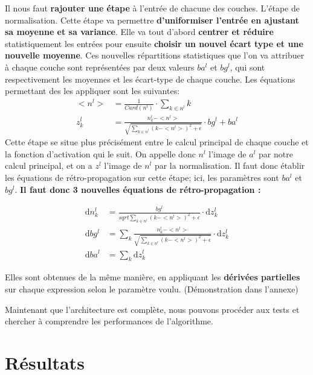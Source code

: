 \documentclass[12pt,a4paper]{extarticle}
\newcommand{\ud}{\mathrm{d}}
\begin{document}
Il nous faut \textbf{rajouter une étape} à l'entrée de chacune des couches. L'étape de normalisation. Cette étape va permettre \textbf{d'uniformiser l'entrée en ajustant sa moyenne et sa variance}. Elle va tout d'abord \textbf{centrer et réduire} statistiquement les entrées pour ensuite \textbf{choisir un nouvel écart type et une nouvelle moyenne}. Ces nouvelles répartitions statistiques que l'on va attribuer à chaque couche sont représentées par deux valeurs $ ba^l $ et $bg^l$, qui sont respectivement les moyennes et les écart-type de chaque couche. Les équations permettant des les appliquer sont les suivantes:
\begin{align}
<n^l>&=\frac{1}{Card(n^l)}\cdot\sum_{k\in n^l}k \\
z^l_k &=\frac{n^l_k-<n^l>}{\sqrt{\sum_{k\in n^l}(k-<n^l>)^2+\epsilon}}\cdot bg^l + ba^l
\end{align}
Cette étape se situe plus précisément entre le calcul principal de chaque couche et la fonction d'activation qui le suit. On appelle donc $n^l$ l'image de $a^l$ par notre calcul principal, et on a $z^l$ l'image de $n^l$ par la normalisation. Il faut donc établir les équations de rétro-propagation sur cette étape; ici, les paramètres sont $ ba^l $ et $bg^l$. \textbf{Il faut donc 3 nouvelles équations de rétro-propagation :}

\begin{align}
\ud n^l_k &= \frac{bg^l}{sqrt{\sum_{k\in n^l}(k-<n^l>)^2+\epsilon}}\cdot \ud z^l_k \\
\ud bg^l &= \sum_k \frac{n^l_k-<n^l>}{\sqrt{\sum_{k\in n^l}(k-<n^l>)^2+\epsilon}}\cdot \ud z^l_k \\
\ud ba^l &= \sum_k \ud z^l_k
\end{align}

Elles sont obtenues de la même manière, en appliquant les \textbf{dérivées partielles} sur chaque expression selon le paramètre voulu. (Démonstration dans l'annexe)

Maintenant que l'architecture est complète, nous pouvons procéder aux tests et chercher à comprendre les performances de l'algorithme.

\section{Résultats}
\end{document}
